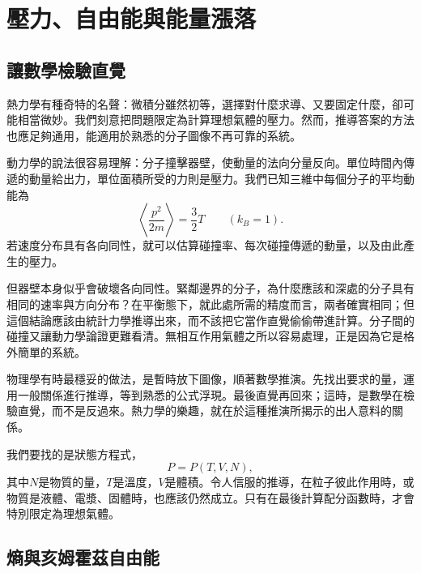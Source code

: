\chapter{壓力、自由能與能量漲落}


\section{讓數學檢驗直覺}

熱力學有種奇特的名聲：微積分雖然初等，選擇對什麼求導、又要固定什麼，卻可能相當微妙。我們刻意把問題限定為計算理想氣體的壓力。然而，推導答案的方法也應足夠通用，能適用於熟悉的分子圖像不再可靠的系統。

動力學的說法很容易理解：分子撞擊器壁，使動量的法向分量反向。單位時間內傳遞的動量給出力，單位面積所受的力則是壓力。我們已知三維中每個分子的平均動能為
\begin{equation}
 \left\langle \frac{p^2}{2m}\right\rangle=\frac{3}{2}T
 \qquad (k_B=1).
 \label{eq:sm5-mean-kinetic-energy}
\end{equation}
若速度分布具有各向同性，就可以估算碰撞率、每次碰撞傳遞的動量，以及由此產生的壓力。

但器壁本身似乎會破壞各向同性。緊鄰邊界的分子，為什麼應該和深處的分子具有相同的速率與方向分布？在平衡態下，就此處所需的精度而言，兩者確實相同；但這個結論應該由統計力學推導出來，而不該把它當作直覺偷偷帶進計算。分子間的碰撞又讓動力學論證更難看清。無相互作用氣體之所以容易處理，正是因為它是格外簡單的系統。

物理學有時最穩妥的做法，是暫時放下圖像，順著數學推演。先找出要求的量，運用一般關係進行推導，等到熟悉的公式浮現。最後直覺再回來；這時，是數學在檢驗直覺，而不是反過來。熱力學的樂趣，就在於這種推演所揭示的出人意料的關係。

我們要找的是狀態方程式，
\begin{equation}
 P=P(T,V,N),
 \label{eq:sm5-equation-of-state-target}
\end{equation}
其中\(N\)是物質的量，\(T\)是溫度，\(V\)是體積。令人信服的推導，在粒子彼此作用時，或物質是液體、電漿、固體時，也應該仍然成立。只有在最後計算配分函數時，才會特別限定為理想氣體。

\section{熵與亥姆霍茲自由能}

